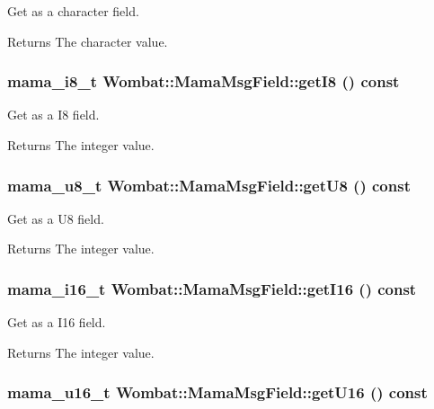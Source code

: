 Get as a character field. \begin{DoxyReturn}{Returns}
The character value. 
\end{DoxyReturn}
\hypertarget{classWombat_1_1MamaMsgField_a6c90df89e3d3572766a19da5f742e883}{
\subsubsection[{getI8}]{\setlength{\rightskip}{0pt plus 5cm}mama\_\-i8\_\-t Wombat::MamaMsgField::getI8 () const}}
\label{classWombat_1_1MamaMsgField_a6c90df89e3d3572766a19da5f742e883}


Get as a I8 field. \begin{DoxyReturn}{Returns}
The integer value. 
\end{DoxyReturn}
\hypertarget{classWombat_1_1MamaMsgField_a186cab304aeb88d3f5cdc17a3d6885cc}{
\subsubsection[{getU8}]{\setlength{\rightskip}{0pt plus 5cm}mama\_\-u8\_\-t Wombat::MamaMsgField::getU8 () const}}
\label{classWombat_1_1MamaMsgField_a186cab304aeb88d3f5cdc17a3d6885cc}


Get as a U8 field. \begin{DoxyReturn}{Returns}
The integer value. 
\end{DoxyReturn}
\hypertarget{classWombat_1_1MamaMsgField_ab8e896683ae8fb744072309b789f7af0}{
\subsubsection[{getI16}]{\setlength{\rightskip}{0pt plus 5cm}mama\_\-i16\_\-t Wombat::MamaMsgField::getI16 () const}}
\label{classWombat_1_1MamaMsgField_ab8e896683ae8fb744072309b789f7af0}


Get as a I16 field. \begin{DoxyReturn}{Returns}
The integer value. 
\end{DoxyReturn}
\hypertarget{classWombat_1_1MamaMsgField_a9b48adb151a0e50b5661e0cfd74be847}{
\subsubsection[{getU16}]{\setlength{\rightskip}{0pt plus 5cm}mama\_\-u16\_\-t Wombat::MamaMsgField::getU16 () const}}
\label{classWombat_1_1MamaMsgField_a9b48adb151a0e50b5661e0cfd74be847}



